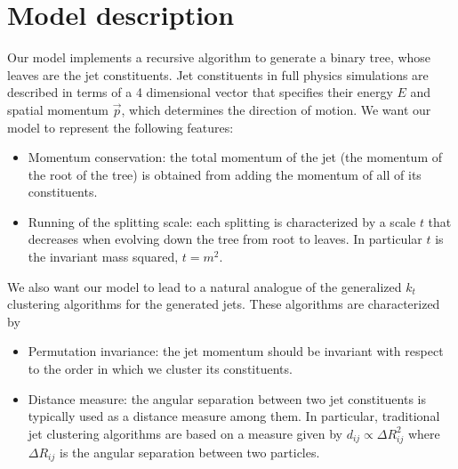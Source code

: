 \documentclass[12pt]{article}
\begin{document}
\vspace{0.6cm}
\section{Model description}

Our model implements a recursive algorithm to generate a binary tree, whose leaves are the jet constituents. Jet constituents in full physics simulations are described in terms of a 4 dimensional vector that specifies their energy $E$ and spatial momentum $\vec{p}$, which determines the direction of motion. 
We want our model to represent the following features:
\begin{itemize}
\item Momentum conservation: the total momentum of the jet (the momentum of the root of the tree) is obtained from adding the momentum of all of its constituents.

\item Running of the splitting scale: each splitting is characterized by a scale $t$ that decreases when evolving down the tree from root to leaves. In particular $t$ is the invariant mass squared, $t = m^2$.





\end{itemize}

We also want our model to lead to a natural analogue of the generalized $k_t$ clustering algorithms for the generated jets. These algorithms are characterized by

\begin{itemize}
\item Permutation invariance: the jet momentum should be invariant with respect to the order in which we cluster its constituents.

\item Distance measure: the angular separation between two jet constituents is typically used as a distance measure among them. In particular, traditional jet clustering algorithms are based on a measure given by 
$d_{ij} \propto  \Delta R_{ij}^2$
where $\Delta R_{ij}$ is the angular separation between two particles.

\end{itemize} 
\end{document}
